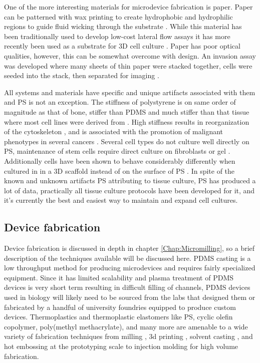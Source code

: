 One of the more interesting materials for microdevice fabrication is paper. Paper can be patterned with wax printing to create hydrophobic and hydrophilic regions to guide fluid wicking through the substrate \cite{Carrilho2009}. While this material has been traditionally used to develop low-cost lateral flow assays it has more recently been used as a substrate for 3D cell culture \cite{Derda2009}. Paper has poor optical qualities, however, this can be somewhat overcome with design. An invasion assay was developed where many sheets of thin paper were stacked together, cells were seeded into the stack, then separated for imaging \cite{Derda2011}.

All systems and materials have specific and unique artifacts associated with them and PS is not an exception. The stiffness of polystyrene is on same order of magnitude as that of bone, stiffer than PDMS and much stiffer than that tissue where most cell lines were derived from \cite{Saha2008SubstrateBehavior}. High stiffness results in reorganization of the cytoskeleton \cite{Discher2005TissueSubstrate.}, and is associated with the promotion of malignant phenotypes in several cancers \cite{Paszek2005TensionalPhenotype, Seo2015, Verbridge2010}. Several cell types do not culture well directly on PS, maintenance of stem cells require direct culture on fibroblasts or gel \cite{Okita2007, Xu2001}. Additionally cells have been shown to behave considerably differently when cultured in in a 3D scaffold instead of on the surface of PS \cite{Cukierman2001, Pampaloni2007TheTissue, Sung2013}. In spite of the known and unknown artifacts PS attributing to tissue culture, PS has produced a lot of data, practically all tissue culture protocols have been developed for it, and it's currently the best and easiest way to maintain and expand cell cultures.

\subsection{Device fabrication}
Device fabrication is discussed in depth in chapter \ref{Chap:Micromilling}, so a brief description of the techniques available will be discussed here. PDMS casting is a low throughput method for producing microdevices and requires fairly specialized equipment. Since it has limited scalability and plasma treatment of PDMS devices is very short term resulting in difficult filling of channels, PDMS devices used in biology will likely need to be sourced from the labs that designed them or fabricated by a handful of university foundries equipped to produce custom devices. Thermoplastics and thermoplastic elastomers like PS, cyclic olefin copolymer, poly(methyl methacrylate), and many more are amenable to a wide variety of fabrication techniques from milling \cite{Guckenberger2015b}, 3d printing \cite{Au2014}, solvent casting \cite{Borysiak2013b}, and hot embossing \cite{Becker2000} at the prototyping scale to injection molding \cite{Piotter1997} for high volume fabrication. 

